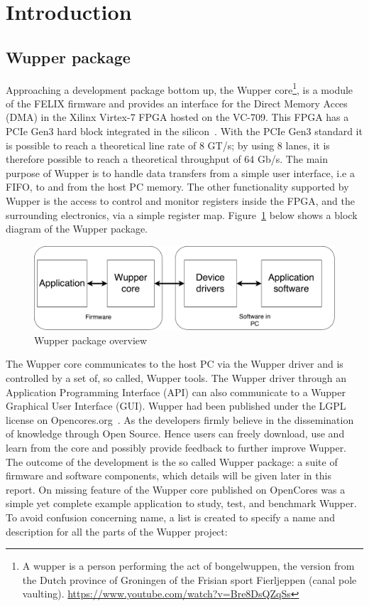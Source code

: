 \section{Introduction}

\subsection {Wupper package}

Approaching a development package bottom up, the Wupper core\footnote{A wupper is a person performing the act of bongelwuppen, the version from the Dutch province of Groningen of the Frisian sport Fierljeppen (canal pole vaulting). \href{https://www.youtube.com/watch?v=Bre8DsQZqSs}{https://www.youtube.com/watch?v=Bre8DsQZqSs}},  is a module of the FELIX firmware and provides an interface for the Direct Memory Acces (DMA) in the Xilinx Virtex-7 FPGA hosted on the VC-709. This FPGA has a PCIe Gen3 hard block integrated in the silicon~\cite{pg023}. With the PCIe Gen3 standard it is possible to reach a theoretical line rate of 8 GT/s; by using 8 lanes, it is therefore possible to reach a theoretical throughput of 64 Gb/s.
The main purpose of Wupper is to handle data transfers from a simple user interface, i.e a FIFO, to and from the host PC memory. The other functionality supported by Wupper is the access to control and monitor registers inside the FPGA, and the surrounding electronics, via a simple register map. Figure~\ref{fig:simplewupperpackage1} below shows a block diagram of the Wupper package. 

\begin{figure}[h]
	\centering
	\includegraphics[width = .8 \textwidth]{figures/wupper_package_simple.pdf}	
	\caption{Wupper package overview}
	\label{fig:simplewupperpackage1}
\end{figure}
The Wupper core communicates to the host PC via the Wupper driver and is controlled by a set of, so called, Wupper tools. The Wupper driver through an Application Programming Interface (API) can also communicate to a Wupper Graphical User Interface (GUI). Wupper had been published under the LGPL license on Opencores.org~\cite{opencores}. As the developers firmly believe in the dissemination of knowledge through Open Source. Hence users can freely download, use and learn from the core and possibly provide feedback to further improve Wupper. The outcome of the development is the so called Wupper package: a suite of firmware and software components, which details will be given later in this report. On missing feature of the Wupper core published on OpenCores was a simple yet complete example application to study, test, and benchmark Wupper. To avoid confusion concerning name, a list is created to specify a name and description for all the parts of the Wupper project:


